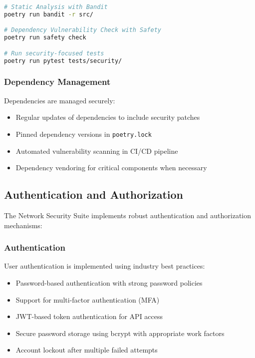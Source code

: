 \begin{lstlisting}[language=bash, caption=Security Testing Commands]
# Static Analysis with Bandit
poetry run bandit -r src/

# Dependency Vulnerability Check with Safety
poetry run safety check

# Run security-focused tests
poetry run pytest tests/security/
\end{lstlisting}

\subsubsection{Dependency Management}
Dependencies are managed securely:

\begin{itemize}
    \item Regular updates of dependencies to include security patches
    \item Pinned dependency versions in \texttt{poetry.lock}
    \item Automated vulnerability scanning in CI/CD pipeline
    \item Dependency vendoring for critical components when necessary
\end{itemize}

\subsection{Authentication and Authorization}
The Network Security Suite implements robust authentication and authorization mechanisms:

\subsubsection{Authentication}
User authentication is implemented using industry best practices:

\begin{itemize}
    \item Password-based authentication with strong password policies
    \item Support for multi-factor authentication (MFA)
    \item JWT-based token authentication for API access
    \item Secure password storage using bcrypt with appropriate work factors
    \item Account lockout after multiple failed attempts
\end{itemize}

